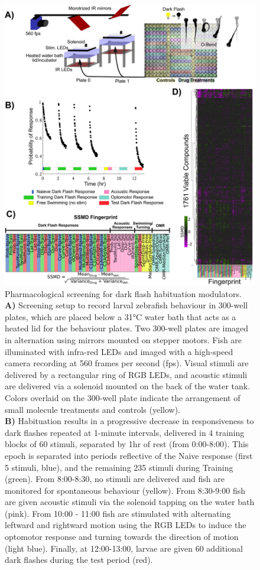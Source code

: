 \documentclass[9pt,lineno]{RandlettLab_elife}
\begin{document}
\begin{figure}
\begin{fullwidth}
\begin{center}

\includegraphics[width=0.77\linewidth]{Figure_1-ScreenSetup}
\caption{Pharmacological screening for dark flash habituation modulators. 
\\ \textbf{A)} Screening setup to record larval zebrafish behaviour in 300-well plates, which are placed below a 31°C water bath that acts as a heated lid for the behaviour plates. Two 300-well plates are imaged in alternation using mirrors mounted on stepper motors. Fish are illuminated with infra-red LEDs and imaged with a high-speed camera recording at 560 frames per second (fps). Visual stimuli are delivered by a rectangular ring of RGB LEDs, and acoustic stimuli are delivered via a solenoid mounted on the back of the water tank. Colors overlaid on the 300-well plate indicate the arrangement of small molecule treatments and controls (yellow). 
\\ \textbf{B)} Habituation results in a progressive decrease in responsiveness to dark flashes repeated at 1-minute intervals, delivered in 4 training blocks of 60 stimuli, separated by 1hr of rest (from 0:00-8:00). This epoch is separated into periods reflective of the Naive response (first 5 stimuli, blue), and the remaining 235 stimuli during Training (green). From 8:00-8:30, no stimuli are delivered and fish are monitored for spontaneous behaviour (yellow). From 8:30-9:00 fish are given acoustic stimuli via the solenoid tapping on the water bath (pink). From 10:00 - 11:00 fish are stimulated with alternating leftward and rightward motion using the RGB LEDs to induce the optomotor response and turning towards the direction of motion (light blue). Finally, at 12:00-13:00, larvae are given 60 additional dark flashes during the test period (red). 
}
\end{center}
\end{fullwidth}
\end{figure}
\end{document}
